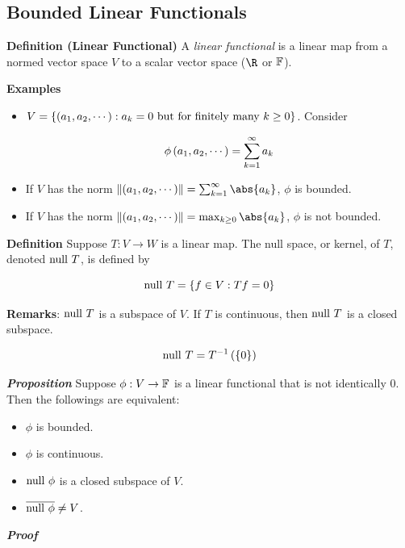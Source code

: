 \documentclass[
]{article}
\begin{document}
\hypertarget{bounded-linear-functionals}{%
\subsection{Bounded Linear
Functionals}\label{bounded-linear-functionals}}

\textbf{Definition (Linear Functional)} A \emph{linear functional} is a
linear map from a normed vector space \(V\) to a scalar vector space
(\(\R\) or \(\mathbb F\)).

\textbf{Examples}

\begin{itemize}
\item
  \(V = \left\{\left(a_1,a_2,\cdots\right): a_k = 0 \text{ but for finitely many }k\ge 0\right\}\).
  Consider

  \[\phi\left(a_1,a_2,\cdots\right) = \sum_{{k} = 1}^{\infty} a_k\]
\item
  If \(V\) has the norm
  \(\norm{\pr{a_1,a_2,\cdots}} = \sinf \abs{a_k}\), \(\phi\) is bounded.
\item
  If \(V\) has the norm
  \(\norm{\pr{a_1,a_2,\cdots}} = \max_{k\ge 0}\abs{a_k}\), \(\phi\) is
  not bounded.
\end{itemize}

\textbf{Definition} Suppose \(T:V\to W\) is a linear map. The null
space, or kernel, of \(T\), denoted \(\text{null } T\), is defined by

\[\text{null } T = \left\{f\in V:Tf = 0\right\}\]

\textbf{Remarks}: \(\text{null } T\) is a subspace of \(V\). If \(T\) is
continuous, then \(\text{null } T\) is a closed subspace.

\[\text{null } T = {T}^{-1}\left(\left\{0\right\}\right)\]

\emph{\textbf{Proposition}} Suppose \(\phi:V\to \mathbb F\) is a linear
functional that is not identically \(0\). Then the followings are
equivalent:

\begin{itemize}
\item
  \(\phi\) is bounded.
\item
  \(\phi\) is continuous.
\item
  \(\text{null } \phi\) is a closed subspace of \(V\).
\item
  \(\overline{\text{null } \phi}\ne V\).
\end{itemize}

\emph{\textbf{Proof}}
\end{document}

